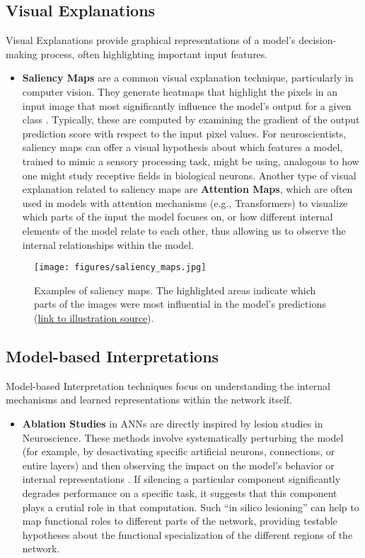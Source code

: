 \subsection{Visual Explanations}
Visual Explanations provide graphical representations of a model's decision-making process, often highlighting important input features.
\begin{itemize}
    \item \textbf{Saliency Maps} are a common visual explanation technique, particularly in computer vision. They generate heatmaps that highlight the pixels in an input image that most significantly influence the model's output for a given class \cite{fong2017interpretable}. Typically, these are computed by examining the gradient of the output prediction score with respect to the input pixel values. For neuroscientists, saliency maps can offer a visual hypothesis about which features a model, trained to mimic a sensory processing task, might be using, analogous to how one might study receptive fields in biological neurons. Another type of visual explanation related to saliency maps are \textbf{Attention Maps}, which are often used in models with attention mechanisms (e.g., Transformers) to visualize which parts of the input the model focuses on, or how different internal elements of the model relate to each other, thus allowing us to observe the internal relationships within the model.
\end{itemize}

\begin{figure}[h!]
    \centering
    \texttt{[image: figures/saliency\_maps.jpg]}
    \caption{Examples of saliency maps. The highlighted areas indicate which parts of the images were most influential in the model's predictions (\href{https://www.geeksforgeeks.org/what-is-saliency-map/}{link to illustration source}).}
    \label{fig:saliency_example}
\end{figure}

\subsection{Model-based Interpretations}
Model-based Interpretation techniques focus on understanding the internal mechanisms and learned representations within the network itself.
\begin{itemize}
    \item \textbf{Ablation Studies} in ANNs are directly inspired by lesion studies in Neuroscience. These methods involve systematically perturbing the model (for example, by desactivating specific artificial neurons, connections, or entire layers) and then observing the impact on the model's behavior or internal representations \cite{kriegeskorte2018cognitive}. If silencing a particular component significantly degrades performance on a specific task, it suggests that this component plays a crutial role in that computation. Such ``in silico lesioning'' can help to map functional roles to different parts of the network, providing testable hypotheses about the functional specialization of the different regions of the network.
\end{itemize}

